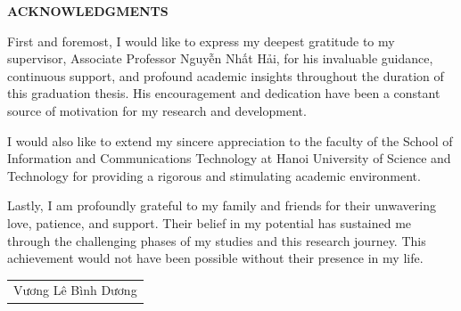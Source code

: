 \documentclass[../main.tex]{subfiles}
\begin{document}
\begin{center}
    \Large{\textbf{ACKNOWLEDGMENTS}}\\
\end{center}
\vspace{1cm}
First and foremost, I would like to express my deepest gratitude to my supervisor, Associate Professor Nguyễn Nhất Hải, for his invaluable guidance, continuous support, and profound academic insights throughout the duration of this graduation thesis. His encouragement and dedication have been a constant source of motivation for my research and development.

I would also like to extend my sincere appreciation to the faculty of the School of Information and Communications Technology at Hanoi University of Science and Technology for providing a rigorous and stimulating academic environment. 

Lastly, I am profoundly grateful to my family and friends for their unwavering love, patience, and support. Their belief in my potential has sustained me through the challenging phases of my studies and this research journey. This achievement would not have been possible without their presence in my life.

\begin{flushright}
\begin{tabular}{@{}c@{}}
Vương Lê Bình Dương
\end{tabular}
\end{flushright} 
\end{document}
